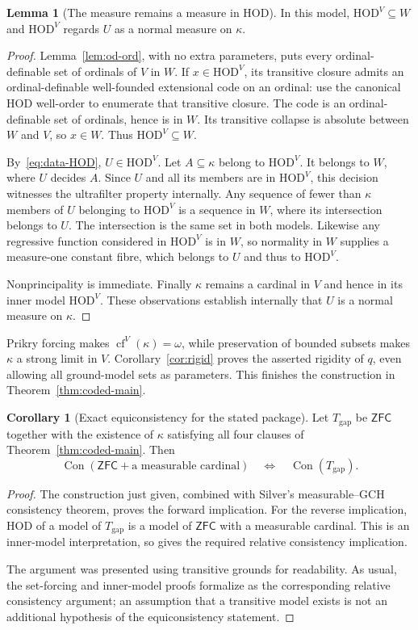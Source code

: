 \documentclass[11pt,letterpaper]{article}
\theoremstyle{definition}
\newtheorem{lemma}[definition]{Lemma}
\newtheorem{corollary}[definition]{Corollary}
\numberwithin{equation}{section}
\newcommand{\ZFC}{\mathsf{ZFC}}
\newcommand{\HOD}{\mathrm{HOD}}
\newcommand{\Con}{\operatorname{Con}}
\newcommand{\cf}{\operatorname{cf}}
\begin{document}
\begin{lemma}[The measure remains a measure in HOD]\label{lem:HOD-measure}
In this model, $\HOD^V\subseteq W$ and $\HOD^V$ regards $U$ as a normal measure on $\kappa$.
\end{lemma}
\begin{proof}
Lemma~\ref{lem:od-ord}, with no extra parameters, puts every ordinal-definable set of ordinals of $V$ in $W$. If $x\in\HOD^V$, its transitive closure admits an ordinal-definable well-founded extensional code on an ordinal: use the canonical HOD well-order to enumerate that transitive closure. The code is an ordinal-definable set of ordinals, hence is in $W$. Its transitive collapse is absolute between $W$ and $V$, so $x\in W$. Thus $\HOD^V\subseteq W$.

By~\eqref{eq:data-HOD}, $U\in\HOD^V$. Let $A\subseteq\kappa$ belong to $\HOD^V$. It belongs to $W$, where $U$ decides $A$. Since $U$ and all its members are in $\HOD^V$, this decision witnesses the ultrafilter property internally. Any sequence of fewer than $\kappa$ members of $U$ belonging to $\HOD^V$ is a sequence in $W$, where its intersection belongs to $U$. The intersection is the same set in both models. Likewise any regressive function considered in $\HOD^V$ is in $W$, so normality in $W$ supplies a measure-one constant fibre, which belongs to $U$ and thus to $\HOD^V$.

Nonprincipality is immediate. Finally $\kappa$ remains a cardinal in $V$ and hence in its inner model $\HOD^V$. These observations establish internally that $U$ is a normal measure on $\kappa$.
\end{proof}

Prikry forcing makes $\cf^V(\kappa)=\omega$, while preservation of bounded subsets makes $\kappa$ a strong limit in $V$. Corollary~\ref{cor:rigid} proves the asserted rigidity of $q$, even allowing all ground-model sets as parameters. This finishes the construction in Theorem~\ref{thm:coded-main}.

\begin{corollary}[Exact equiconsistency for the stated package]\label{cor:equiconsistency}
Let $T_{\mathrm{gap}}$ be $\ZFC$ together with the existence of $\kappa$ satisfying all four clauses of Theorem~\ref{thm:coded-main}. Then
\[
\Con(\ZFC+\text{a measurable cardinal})
\quad\Longleftrightarrow\quad
\Con(T_{\mathrm{gap}}).
\]
\end{corollary}
\begin{proof}
The construction just given, combined with Silver's measurable--GCH consistency theorem, proves the forward implication. For the reverse implication, $\HOD$ of a model of $T_{\mathrm{gap}}$ is a model of $\ZFC$ with a measurable cardinal. This is an inner-model interpretation, so gives the required relative consistency implication.

The argument was presented using transitive grounds for readability. As usual, the set-forcing and inner-model proofs formalize as the corresponding relative consistency argument; an assumption that a transitive model exists is not an additional hypothesis of the equiconsistency statement.
\end{proof}
\end{document}
